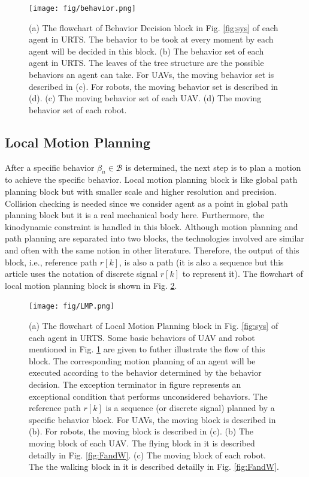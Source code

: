 \documentclass[journal,12pt,onecolumn,draftclsnofoot,]{IEEEtran}
\begin{document}
\begin{figure}[htbp]
    \centering
    \texttt{[image: fig/behavior.png]}\caption{
        (a) The flowchart of Behavior Decision block in Fig. \ref{fig:sys} of each agent in URTS. The behavior to be took at every moment by each agent will be decided in this block. 
        (b) The behavior set of each agent in URTS. The leaves of the tree structure are the possible behaviors an agent can take. For UAVs, the moving behavior set is described in (c). For robots, the moving behavior set is described in (d). 
        (c) The moving behavior set of each UAV. 
        (d) The moving behavior set of each robot.}%
    \label{fig:behavior}
\end{figure}

\subsection{Local Motion Planning}
After a specific behavior $\beta_n\in\mathcal{B}$ is determined, the next step is to plan a motion to achieve the specific behavior. Local motion planning block is like global path planning block but with smaller scale and higher resolution and precision. Collision checking is needed since we consider agent as a point in global path planning block but it is a real mechanical body here. Furthermore, the kinodynamic constraint is handled in this block. Although motion planning and path planning are separated into two blocks, the technologies involved are similar and often with the same notion in other literature. Therefore, the output of this block, i.e., reference path $r[k]$, is also a path (it is also a sequence but this article uses the notation of discrete signal $r[k]$ to represent it). The flowchart of local motion planning block is shown in Fig. \ref{fig:LMP}.
\begin{figure}[htbp]
    \centering
    \texttt{[image: fig/LMP.png]}\caption{
        (a) The flowchart of Local Motion Planning block in Fig. \ref{fig:sys} of each agent in URTS. Some basic behaviors of UAV and robot mentioned in Fig. \ref{fig:behavior} are given to futher illustrate the flow of this block. The corresponding motion planning of an agent will be executed according to the behavior determined by the behavior decision. The exception terminator in figure represents an exceptional condition that performs unconsidered behaviors. The reference path $r[k]$ is a sequence (or discrete signal) planned by a specific behavior block. For UAVs, the moving block is described in (b). For robots, the moving block is described in (c). 
        (b) The moving block of each UAV. The flying block in it is described detailly in Fig. \ref{fig:FandW}. 
        (c) The moving block of each robot. The the walking block in it is described detailly in Fig. \ref{fig:FandW}.}
    \label{fig:LMP}
\end{figure}
\end{document}
